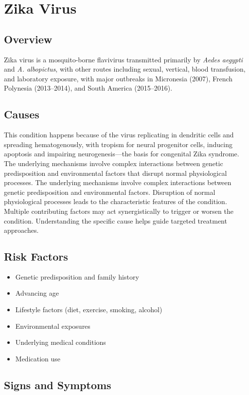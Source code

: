 \chapter{Zika Virus}
\label{sec:Zika Virus}

\section{Overview}
Zika virus is a mosquito-borne flavivirus transmitted primarily by \textit{Aedes aegypti} and \textit{A. albopictus}, with other routes including sexual, vertical, blood transfusion, and laboratory exposure, with major outbreaks in Micronesia (2007), French Polynesia (2013--2014), and South America (2015--2016).
\section{Causes}
This condition happens because of the virus replicating in dendritic cells and spreading hematogenously, with tropism for neural progenitor cells, inducing apoptosis and impairing neurogenesis---the basis for congenital Zika syndrome. The underlying mechanisms involve complex interactions between genetic predisposition and environmental factors that disrupt normal physiological processes. The underlying mechanisms involve complex interactions between genetic predisposition and environmental factors. Disruption of normal physiological processes leads to the characteristic features of the condition. Multiple contributing factors may act synergistically to trigger or worsen the condition. Understanding the specific cause helps guide targeted treatment approaches.
\section{Risk Factors}


\begin{itemize}[noitemsep]
  \item Genetic predisposition and family history
  \item Advancing age
  \item Lifestyle factors (diet, exercise, smoking, alcohol)
  \item Environmental exposures
  \item Underlying medical conditions
  \item Medication use
\end{itemize}
\section{Signs and Symptoms}

